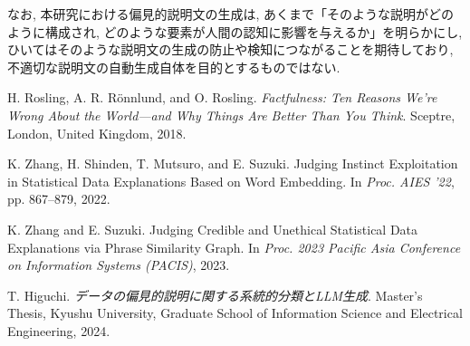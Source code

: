 \documentclass[dvipdfmx]{jsarticle}
\begin{document}
なお, 本研究における偏見的説明文の生成は, あくまで「そのような説明がどのように構成され, どのような要素が人間の認知に影響を与えるか」を明らかにし, ひいてはそのような説明文の生成の防止や検知につながることを期待しており, 不適切な説明文の自動生成自体を目的とするものではない.

\begin{thebibliography}{99}
  H. Rosling, A. R. Rönnlund, and O. Rosling. \textit{Factfulness: Ten Reasons We’re Wrong About the World—and Why Things Are Better Than You Think}. Sceptre, London, United Kingdom, 2018.

  K. Zhang, H. Shinden, T. Mutsuro, and E. Suzuki. Judging Instinct Exploitation in Statistical Data Explanations Based on Word Embedding. In \textit{Proc. AIES ’22}, pp. 867–879, 2022.

  K. Zhang and E. Suzuki. Judging Credible and Unethical Statistical Data Explanations via Phrase Similarity Graph. In \textit{Proc. 2023 Pacific Asia Conference on Information Systems (PACIS)}, 2023.

  T. Higuchi. \textit{データの偏見的説明に関する系統的分類とLLM生成}.
  Master's Thesis, Kyushu University, Graduate School of Information Science and Electrical Engineering, 2024.


\end{thebibliography}
\end{document}
